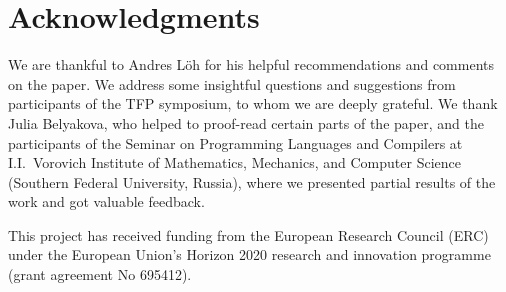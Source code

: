 \documentclass[runningheads]{llncs}
\begin{document}
\section*{Acknowledgments}
\label{sec:acks}

We are thankful to Andres L\"{o}h for his helpful recommendations and comments on the paper. We address some insightful questions and suggestions from participants of the TFP symposium, to whom we are deeply grateful. We thank Julia Belyakova, who helped to proof-read certain parts of the paper, 
and the participants of the Seminar on Programming Languages and Compilers at 
I.I.~Vorovich Institute of Mathematics, Mechanics, and Computer Science (Southern Federal
University, Russia), where we presented partial results of the work and got valuable feedback.

This project has received funding from the European Research Council (ERC) under the
European Union's Horizon 2020 research and innovation programme (grant agreement No 695412).

%
%
%


%
\end{document}
